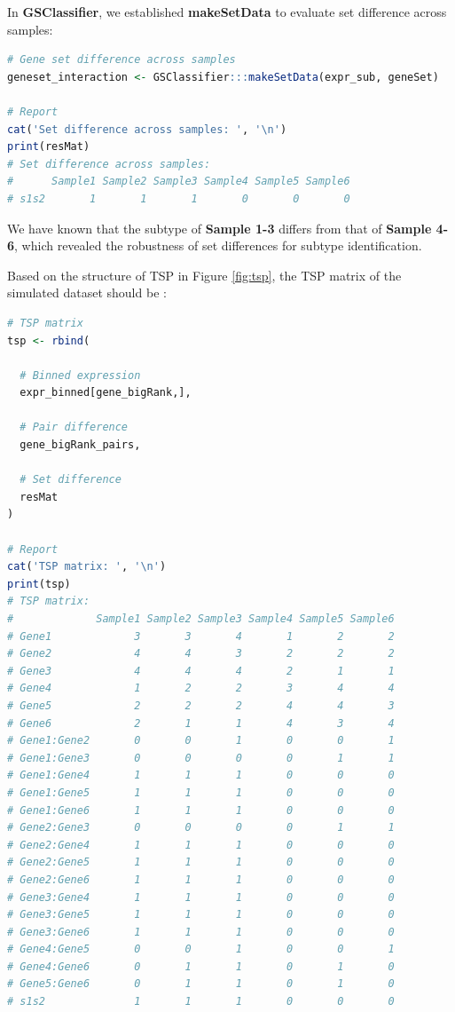 \documentclass[
  12pt,
]{book}
\begin{document}
In \textbf{GSClassifier}, we established \textbf{makeSetData} to evaluate set difference across samples:

\begin{lstlisting}[language=R]
# Gene set difference across samples
geneset_interaction <- GSClassifier:::makeSetData(expr_sub, geneSet)

# Report 
cat('Set difference across samples: ', '\n')
print(resMat)
# Set difference across samples:  
#      Sample1 Sample2 Sample3 Sample4 Sample5 Sample6
# s1s2       1       1       1       0       0       0
\end{lstlisting}

We have known that the subtype of \textbf{Sample 1-3} differs from that of \textbf{Sample 4-6}, which revealed the robustness of set differences for subtype identification.

Based on the structure of TSP in Figure \ref{fig:tsp}, the TSP matrix of the simulated dataset should be :

\begin{lstlisting}[language=R]
# TSP matrix
tsp <- rbind(
  
  # Binned expression
  expr_binned[gene_bigRank,],
  
  # Pair difference
  gene_bigRank_pairs,
  
  # Set difference
  resMat
)

# Report 
cat('TSP matrix: ', '\n')
print(tsp)
# TSP matrix:  
#             Sample1 Sample2 Sample3 Sample4 Sample5 Sample6
# Gene1             3       3       4       1       2       2
# Gene2             4       4       3       2       2       2
# Gene3             4       4       4       2       1       1
# Gene4             1       2       2       3       4       4
# Gene5             2       2       2       4       4       3
# Gene6             2       1       1       4       3       4
# Gene1:Gene2       0       0       1       0       0       1
# Gene1:Gene3       0       0       0       0       1       1
# Gene1:Gene4       1       1       1       0       0       0
# Gene1:Gene5       1       1       1       0       0       0
# Gene1:Gene6       1       1       1       0       0       0
# Gene2:Gene3       0       0       0       0       1       1
# Gene2:Gene4       1       1       1       0       0       0
# Gene2:Gene5       1       1       1       0       0       0
# Gene2:Gene6       1       1       1       0       0       0
# Gene3:Gene4       1       1       1       0       0       0
# Gene3:Gene5       1       1       1       0       0       0
# Gene3:Gene6       1       1       1       0       0       0
# Gene4:Gene5       0       0       1       0       0       1
# Gene4:Gene6       0       1       1       0       1       0
# Gene5:Gene6       0       1       1       0       1       0
# s1s2              1       1       1       0       0       0
\end{lstlisting}
\end{document}

